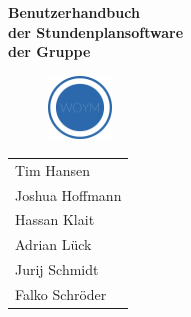 \documentclass[fontsize=12pt]{scrartcl}
\begin{document}
  \thispagestyle{empty}
  \vspace{3cm}
  \begin{minipage}[H]{\textwidth}
  \begin{center}
  \vspace{1cm}
  \bf
  {\Large Benutzerhandbuch}\\
  der Stundenplansoftware \\
  der Gruppe\\
    \begin{figure}[H]
    \centering
    \includegraphics[width=0.15\textwidth]{../WOYM.png}
    \end{figure}
  \vfill
  \end{center}
  \end{minipage}
  \vfill
  \begin{minipage}[H]{\textwidth}
  \begin{center}
  \sf
  \begin{tabular}{l}
  Tim Hansen \\
  Joshua Hoffmann\\
  Hassan Klait \\
  Adrian Lück \\
  Jurij Schmidt\\
  Falko Schröder
  \end{tabular}
  \end{center}
  \end{minipage}
\restoregeometry

\cleardoubleemptypage

\newpage

  \thispagestyle{fancy}
  \fancyhead{}
  \fancyfoot{}
  \renewcommand{\headrulewidth}{0.4pt}
  \tableofcontents

\newpage

\end{document}
